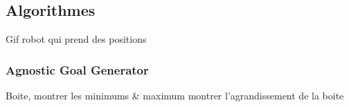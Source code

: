 \documentclass[french]{beamer}
\begin{document}
\subsection{Algorithmes}

\begin{frame}

    Gif robot qui prend des positions
    


\end{frame}


\begin{frame}
    \frametitle{Agnostic Goal Generator}

    Boite, montrer les minimums \& maximum
    montrer l'agrandissement de la boite

\end{frame}

\end{document}
